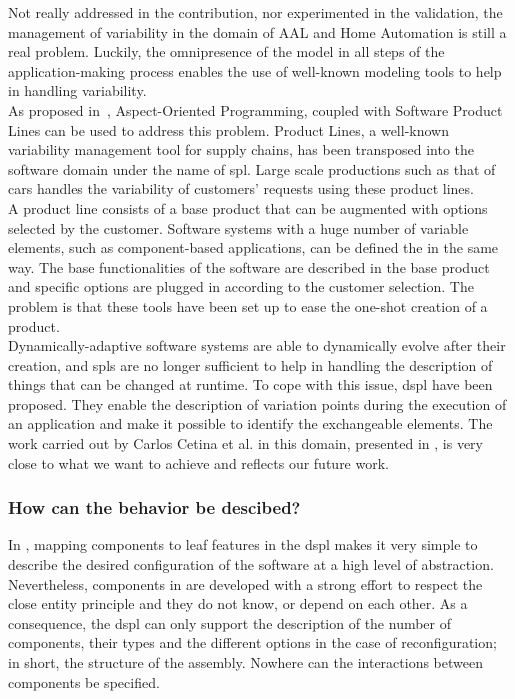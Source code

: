Not really addressed in the contribution, nor experimented in the validation, the management of variability in the domain of AAL and Home Automation is still a real problem. Luckily, the omnipresence of the model in all steps of the application-making process enables the use of well-known modeling tools to help in handling variability.\\

As proposed in~\cite{Morin:2010}, Aspect-Oriented Programming, coupled with Software Product Lines can be used to address this problem. Product Lines, a well-known variability management tool for supply chains, has been transposed into the software domain under the name of \gls{spl}. Large scale productions such as that of cars handles the variability of customers' requests using these product lines.\\
A product line consists of a base product that can be augmented with options selected by the customer. Software systems with a huge number of variable elements, such as component-based applications, can be defined the in the same way. The base functionalities of the software are described in the base product and specific options are plugged in according to the customer selection. The problem is that these tools have been set up to ease the one-shot creation of a product.\\

Dynamically-adaptive software systems are able to dynamically evolve after their creation, and \gls{spl}s are no longer sufficient to help in handling the description of things that can be changed at runtime. To cope with this issue, \gls{dspl} have been proposed. They enable the description of variation points during the execution of an application and make it possible to identify the exchangeable elements. The work carried out by Carlos Cetina et al. in this domain, presented in \cite{Cetina:2009}, is very close to what we want to achieve and reflects our future work.\\


\subsubsection{How can the behavior be descibed?}

In \enti{}, mapping components to leaf features in the \gls{dspl} makes it very simple to describe the desired configuration of the software at a high level of abstraction. Nevertheless, components in \enti{} are developed with a strong effort to respect the close entity principle and they do not know, or depend on each other. As a consequence, the \gls{dspl} can only support the description of the number of components, their types and the different options in the case of reconfiguration; in short, the structure of the assembly. Nowhere can the interactions between components be specified.\\


